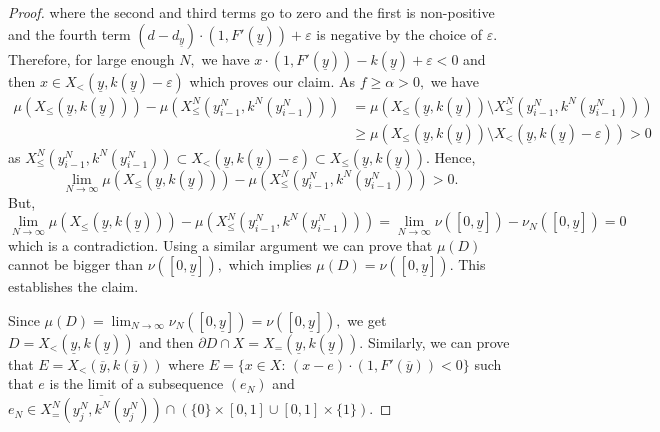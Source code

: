 \documentclass[12pt,reqno]{amsart}
\begin{document}
\begin{proof}
where the second and third terms go to zero and the first is non-positive and the fourth term $(d-d_{\underline{y}})\cdot(1,F'(\underline{y}))+\varepsilon$ is negative by the choice of $\varepsilon.$ Therefore, for large enough $N,$ 
we have $x\cdot(1,F'(\underline{y}))-k(\underline{y})+\varepsilon<0$ and then $x\in X_<(\underline{y},k(\underline{y})-\varepsilon) $ which proves our claim. As $f\ge\alpha>0,$ we have 
\[\begin{array}{ll}
\mu(X_\le(\underline{y},k(\underline{y})))-\mu(X^N_\le(y_{i-1}^N,k^N(y_{i-1}^N)))&=\mu(X_\le(\underline{y},k(\underline{y}))\setminus X^N_\le(y_{i-1}^N,k^N(y_{i-1}^N)))\\
&\ge\mu(X_\le(\underline{y},k(\underline{y}))\setminus X_<(\underline{y},k(\underline{y})-\varepsilon))>0\end{array}\] as $X^N_\le(y_{i-1}^N,k^N(y_{i-1}^N))\subset X_<(\underline{y},k(\underline{y})-\varepsilon)\subset X_\le(\underline{y},k(\underline{y})).$ Hence, \[\lim_{N\to\infty}\mu(X_\le(\underline{y},k(\underline{y})))-\mu(X^N_\le(y_{i-1}^N,k^N(y_{i-1}^N)))>0.\] But, 
\[\lim_{N\to\infty}\mu(X_\le(\underline{y},k(\underline{y})))-\mu(X^N_\le(y_{i-1}^N,k^N(y_{i-1}^N)))=\lim_{N\to\infty}\nu([0,\underline{y}])-\nu_N([0,\underline{y}])=0\] which is a contradiction. Using a similar argument we can prove that $\mu(D)$ cannot be bigger than $\nu([0,\underline{y}]),$ which implies $\mu(D)=\nu([0,\underline{y}]).$  This establishes the claim.









Since $\mu(D)=\lim_{N\to\infty}\nu_N([0,{\underline{y}}])=\nu([0,{\underline{y}}]),$ we get $D=X_<({\underline{y}},k({\underline{y}}))$ and then $\partial D\cap X=X_=(\underline{y},k(\underline{y})).$ Similarly, we can prove that  $E=X_<(\overline{y},k(\overline{y}))$ where $E=\{x\in X:\, (x-e)\cdot(1,F'(\overline{y}))<0\}$ such that $e$ is the limit of a subsequence $(e_N)$ and $e_N\in \overline{X_=^N(y_j^N,k^N(y_j^N))}\cap(\{0\}\times [0,1]\cup [0,1]\times\{1\}).$


\end{proof}
\end{document}
